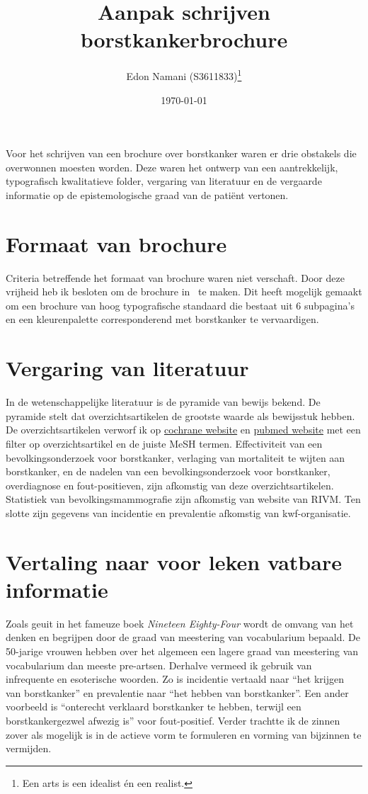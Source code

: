 \documentclass{scrartcl}
\title{Aanpak schrijven borstkankerbrochure}
\author{Edon Namani (S3611833)\thanks{Een arts is een idealist \'en een realist.}}
\date{\today}
\begin{document}
\maketitle

Voor het schrijven van een brochure over borstkanker waren er drie obstakels die overwonnen moesten worden. Deze waren het ontwerp van een aantrekkelijk, typografisch kwalitatieve folder, vergaring van literatuur en de vergaarde informatie op de epistemologische graad van de pati\"ent vertonen.

\section{Formaat van brochure}
Criteria betreffende het formaat van brochure waren niet verschaft. Door deze vrijheid heb ik besloten om de brochure in \XeLaTeX\ te maken. Dit heeft mogelijk gemaakt om een brochure van hoog typografische standaard die bestaat uit 6 subpagina's en een kleurenpalette corresponderend met borstkanker te vervaardigen.

\section{Vergaring van literatuur}
In de wetenschappelijke literatuur is de pyramide van bewijs bekend. De pyramide stelt dat overzichtsartikelen de grootste waarde als bewijsstuk hebben. De overzichtsartikelen verworf ik op \href{https://www.cochranelibrary.com/}{cochrane website} en \href{https://www.ncbi.nlm.nih.gov/pubmed/}{pubmed website} met een filter op overzichtsartikel en de juiste MeSH termen. Effectiviteit van een bevolkingsonderzoek voor borstkanker, verlaging van mortaliteit te wijten aan borstkanker, en de nadelen van een bevolkingsonderzoek voor borstkanker, overdiagnose en fout-positieven, zijn afkomstig van deze overzichtsartikelen. Statistiek van bevolkingsmammografie zijn afkomstig van website van \textsc{RIVM}. Ten slotte zijn gegevens van incidentie en prevalentie afkomstig van kwf-organisatie.

\section{Vertaling naar voor leken vatbare informatie}
Zoals geuit in het fameuze boek \textit{Nineteen Eighty-Four} wordt de omvang van het denken en begrijpen door de graad van meestering van vocabularium bepaald. De 50-jarige vrouwen hebben over het algemeen een lagere graad van meestering van vocabularium dan meeste pre-artsen. Derhalve vermeed ik gebruik van infrequente en esoterische woorden. Zo is incidentie vertaald naar ``het krijgen van borstkanker'' en prevalentie naar ``het hebben van borstkanker''. Een ander voorbeeld is ``onterecht verklaard borstkanker te hebben, terwijl een borstkankergezwel afwezig is'' voor fout-positief. Verder trachtte ik de zinnen zover als mogelijk is in de actieve vorm te formuleren en vorming van bijzinnen te vermijden.
\end{document}
